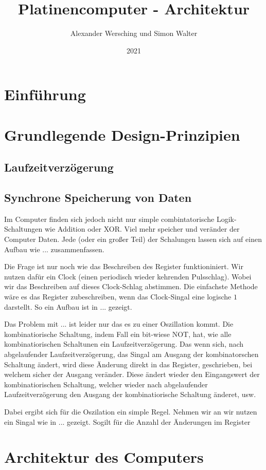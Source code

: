 \documentclass{scrartcl}
\begin{document}
    \title{Platinencomputer - Architektur}
    \author{Alexander Wersching und Simon Walter}
    \date{2021}
    \maketitle

    \newpage
    \tableofcontents
    \newpage

    \section{Einführung}

    \section{Grundlegende Design-Prinzipien}
    
    \subsection{Laufzeitverzögerung}
    
    \subsection{Synchrone Speicherung von Daten}

    Im Computer finden sich jedoch nicht nur simple combintatorische Logik-Schaltungen wie Addition oder XOR. Viel mehr speicher und veränder der Computer Daten. Jede (oder ein großer Teil) der Schalungen lassen sich auf einen Aufbau wie ... zusammenfassen.

    Die Frage ist nur noch wie das Beschreiben des Register funktioniniert. Wir nutzen dafür ein Clock (einen periodisch wieder kehrenden Pulsschlag). Wobei wir das Beschreiben auf dieses Clock-Schlag abstimmen. Die einfachste Methode wäre es das Register zubeschreiben, wenn das Clock-Singal eine logische $1$ darstellt. So ein Aufbau ist in ... gezeigt.

    Das Problem mit ... ist leider nur das es zu einer Oszillation kommt. Die kombinatiorische Schaltung, indem Fall ein bit-wiese NOT, hat, wie alle kombinatiorischen Schaltunen ein Laufzeitverzögerung. Das wenn sich, nach abgelaufender Laufzeitverzögerung, das Singal am Ausgang der kombinatorschen Schaltung ändert, wird diese Änderung direkt in das Register, geschrieben, bei welchem sicher der Ausgang veränder. Diese ändert wieder den Eingangswert der kombinatiorischen Schaltung, welcher wieder nach abgelaufender Laufzeitverzögerung den Ausgang der kombinatiorische Schaltung änderet, usw. 
    
    Dabei ergibt sich für die Oszilation ein simple Regel. Nehmen wir an wir nutzen ein Singal wie in ... gezeigt. Sogilt für die Anzahl der Änderungen im Register

    \section{Architektur des Computers}
\end{document}
